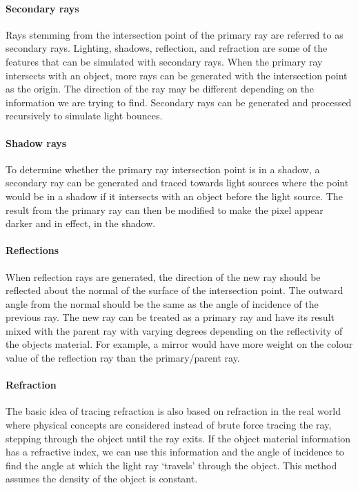 \documentclass[final]{cmpreport}
\begin{document}
\paragraph{Secondary rays} Rays stemming from the intersection point of the primary ray are referred to as secondary rays. Lighting, shadows, reflection, and refraction are some of the features that can be simulated with secondary rays. When the primary ray intersects with an object, more rays can be generated with the intersection point as the origin. The direction of the ray may be different depending on the information we are trying to find. Secondary rays can be generated and processed recursively to simulate light bounces.

\paragraph{Shadow rays} To determine whether the primary ray intersection point is in a shadow, a secondary ray can be generated and traced towards light sources where the point would be in a shadow if it intersects with an object before the light source. The result from the primary ray can then be modified to make the pixel appear darker and in effect, in the shadow.

\paragraph{Reflections} When reflection rays are generated, the direction of the new ray should be reflected about the normal of the surface of the intersection point. The outward angle from the normal should be the same as the angle of incidence of the previous ray. The new ray can be treated as a primary ray and have its result mixed with the parent ray with varying degrees depending on the reflectivity of the objects material. For example, a mirror would have more weight on the colour value of the reflection ray than the primary/parent ray. 

\paragraph{Refraction} The basic idea of tracing refraction is also based on refraction in the real world where physical concepts are considered instead of brute force tracing the ray, stepping through the object until the ray exits. If the object material information has a refractive index, we can use this information and the angle of incidence to find the angle at which the light ray \lq{}travels\rq{} through the object. This method assumes the density of the object is constant.
\end{document}

